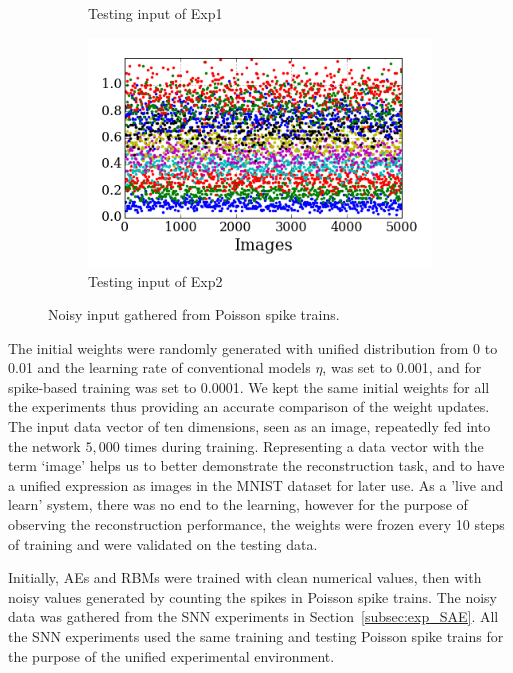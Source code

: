 \begin{figure}
\begin{subfigure}[t]{0.48\textwidth}
		\caption{Testing input of Exp1}
	\end{subfigure}
	\begin{subfigure}[t]{0.48\textwidth}
		\includegraphics[width=\textwidth]{pics_sdlm/21_exp_AE_noise/exp2.png}
		\caption{Testing input of Exp2}
	\end{subfigure}
	\caption{Noisy input gathered from Poisson spike trains.}
	\label{fig:noise_input}
\end{figure}

The initial weights were randomly generated with unified distribution from 0 to 0.01 and the learning rate of conventional models $\eta$, was set to 0.001, and for spike-based training was set to 0.0001.
We kept the same initial weights for all the experiments thus providing an accurate comparison of the weight updates.
The input data vector of ten dimensions, seen as an image, repeatedly fed into the network $5,000$ times during training.
Representing a data vector with the term `image' helps us to better demonstrate the reconstruction task, and to have a unified expression as images in the MNIST dataset for later use.
As a 'live and learn' system, there was no end to the learning, however for the purpose of observing the reconstruction performance, the weights were frozen every 10 steps of training and were validated on the testing data. 

Initially, AEs and RBMs were trained with clean numerical values, then with noisy values generated by counting the spikes in Poisson spike trains.
The noisy data was gathered from the SNN experiments in Section~\ref{subsec:exp_SAE}.
All the SNN experiments used the same training and testing Poisson spike trains for the purpose of the unified experimental environment.

